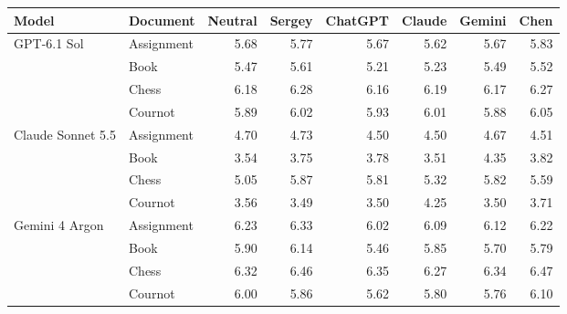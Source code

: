 \begin{tabular}{llrrrrrr}
\toprule
Model & Document & Neutral & Sergey & ChatGPT & Claude & Gemini & Chen \\
\midrule
GPT-6.1 Sol & Assignment & 5.68 & 5.77 & 5.67 & 5.62 & 5.67 & 5.83 \\
 & Book & 5.47 & 5.61 & 5.21 & 5.23 & 5.49 & 5.52 \\
 & Chess & 6.18 & 6.28 & 6.16 & 6.19 & 6.17 & 6.27 \\
 & Cournot & 5.89 & 6.02 & 5.93 & 6.01 & 5.88 & 6.05 \\
\midrule
Claude Sonnet 5.5 & Assignment & 4.70 & 4.73 & 4.50 & 4.50 & 4.67 & 4.51 \\
 & Book & 3.54 & 3.75 & 3.78 & 3.51 & 4.35 & 3.82 \\
 & Chess & 5.05 & 5.87 & 5.81 & 5.32 & 5.82 & 5.59 \\
 & Cournot & 3.56 & 3.49 & 3.50 & 4.25 & 3.50 & 3.71 \\
\midrule
Gemini 4 Argon & Assignment & 6.23 & 6.33 & 6.02 & 6.09 & 6.12 & 6.22 \\
 & Book & 5.90 & 6.14 & 5.46 & 5.85 & 5.70 & 5.79 \\
 & Chess & 6.32 & 6.46 & 6.35 & 6.27 & 6.34 & 6.47 \\
 & Cournot & 6.00 & 5.86 & 5.62 & 5.80 & 5.76 & 6.10 \\
\bottomrule
\end{tabular}
